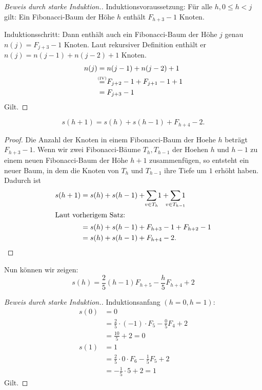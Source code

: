 \documentclass{scrartcl} %
\begin{document}
\begin{aufgabe}
\begin{enumerate}[label=(\alph*)]
\begin{proof}[Beweis durch starke Induktion.]
                Induktionsvoraussetzung: Für alle $h, 0 \leq h < j$ gilt: Ein Fibonacci-Baum der Höhe $h$ enthält $F_{h + 3} - 1$ Knoten.

                Induktionsschritt: Dann enthält auch ein Fibonacci-Baum der Höhe $j$ genau $n(j) = F_{j + 3} - 1$ Knoten. Laut rekursiver Definition enthält er $n(j) = n(j - 1) + n(j - 2) + 1$ Knoten.
                \begin{align*}
                    n(j) &= n(j - 1) + n(j - 2) + 1\\
                    &\stackrel{\mathclap{\text{\tiny (IV)}}}{=} F_{j + 2} - 1 + F_{j + 1} - 1 + 1\\
                    &= F_{j + 3} - 1
                \end{align*}
                Gilt.
            \end{proof}
            
            \begin{theorem*}
                \[
                    s(h + 1) = s(h) + s(h - 1) + F_{h + 4} - 2.
                \]
            \end{theorem*}
            \begin{proof}
                Die Anzahl der Knoten in einem Fibonacci-Baum der Hoehe $h$ beträgt $F_{h + 3} - 1$. Wenn wir zwei Fibonacci-Bäume $T_h, T_{h - 1}$ der Hoehen $h$ und $h - 1$ zu einem neuen Fibonacci-Baum der Höhe $h + 1$ zusammenfügen, so entsteht ein neuer Baum, in dem die Knoten von $T_h$ und $T_{h - 1}$ ihre Tiefe um $1$ erhöht haben. Dadurch ist
                \begin{align*}
                    s(h + 1) &= s(h) + s(h - 1) + \sum_{\mathclap{v \in T_h}}1 + \sum_{\mathclap{v \in T_{h - 1}}}1\\
                    \intertext{Laut vorherigem Satz:}
                    &= s(h) + s(h - 1) + F_{h + 3} - 1 + F_{h + 2} - 1\\
                    &= s(h) + s(h - 1) + F_{h + 4} - 2.
                \end{align*}
            \end{proof}
            Nun können wir zeigen:
            \[
                s(h) = \frac{2}{5}(h - 1) F_{h + 5} - \frac{h}{5}F_{h + 4} + 2
            \]
            \begin{proof}[Beweis durch starke Induktion.]
                Induktionsanfang $(h = 0, h = 1)$:
                \begin{align*}
                    s(0) &= 0\\
                    &= \frac{2}{5}\cdot (-1) \cdot F_5 - \frac{0}{5}F_4 + 2\\
                    &= \frac{10}{5} + 2 = 0\\
                    s(1) &= 1\\
                    &= \frac{2}{5}\cdot 0 \cdot F_6 - \frac{1}{5}F_5 + 2\\
                    &= -\frac{1}{5}\cdot 5 + 2 = 1
                \end{align*}
                Gilt.


\end{proof}
\end{enumerate}
\end{aufgabe}
\end{document}
